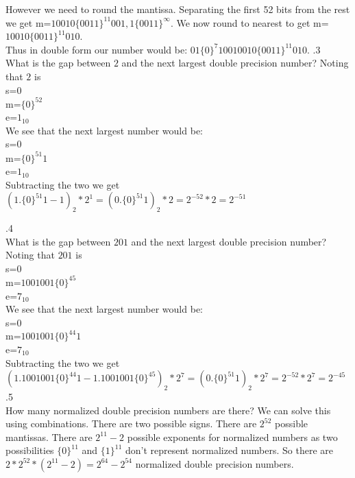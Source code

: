 \documentclass[12pt]{article}
\makeatletter
\theoremstyle{homework}
\newenvironment{exercise}[1]
{\def\@currentlabel{#1}\exercisecore}
{\endexercisecore}
\makeatother
\begin{document}
However we need to round the mantissa.  Separating the first 52 bits from the rest we get m=$10010\{0011\}^{11} 001,1 \{0011\}^\infty$.  We now round to nearest to get m=$10010\{0011\}^{11} 010$.\\
Thus in double form our number would be: $01\{0\}^7 10010010\{0011\}^{11} 010$.
\begin{exercise}

5.3\\
What is the gap between $2$ and the next largest double precision number?
\end{exercise}
Noting that $2$ is\\
s=$0$\\
m=$\{0\}^{52}$\\
e=$1_{10}$\\
We see that the next largest number would be:\\
s=$0$\\
m=$\{0\}^{51}1$\\
e=$1_{10}$\\
Subtracting the two we get $(1.\{0\}^{51}1-1)_2*2^1=(0.\{0\}^{51}1)_2*2=2^{-52}*2=2^{-51}$

\begin{exercise}

5.4\\
What is the gap between $201$ and the next largest double precision number?
\end{exercise}
Noting that $201$ is\\
s=$0$\\
m=$1001001\{0\}^{45}$\\
e=$7_{10}$\\
We see that the next largest number would be:\\
s=$0$\\
m=$1001001\{0\}^{44}1$\\
e=$7_{10}$\\
Subtracting the two we get $(1.1001001\{0\}^{44}1-1.1001001\{0\}^{45})_2*2^7=(0.\{0\}^{51}1)_2*2^7=2^{-52}*2^7=2^{-45}$
\begin{exercise}

5.5\\
How many normalized double precision numbers are there?
\end{exercise}
We can solve this using combinations.  There are two possible signs.  There are $2^{52}$ possible mantissas.  There are $2^{11}-2$ possible exponents for normalized numbers as two possibilities $\{0\}^{11}$ and $\{1\}^{11}$ don't represent normalized numbers.  So there are $2*2^{52}*(2^{11}-2)=2^{64}-2^{54}$ normalized double precision numbers.
\end{document}
